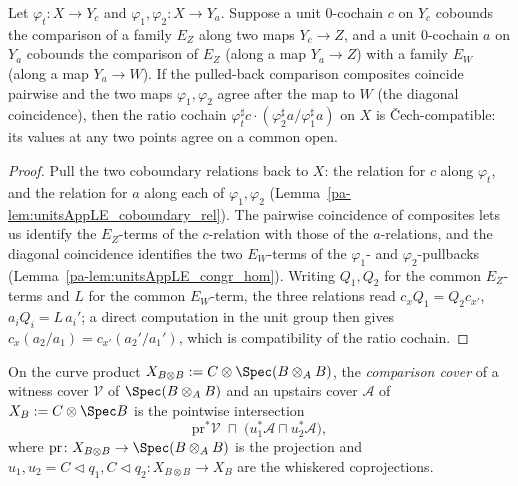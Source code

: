 \begin{lemma}
  \label{pa-lem:ratio_compat}
  \leanok

  Let \(\varphi_t \colon X \to Y_c\) and \(\varphi_1, \varphi_2 \colon X \to Y_a\). Suppose a
  unit \(0\)-cochain \(c\) on \(Y_c\) cobounds the comparison of a family \(E_Z\) along two maps
  \(Y_c \to Z\), and a unit \(0\)-cochain \(a\) on \(Y_a\) cobounds the comparison of \(E_Z\)
  (along a map \(Y_a \to Z\)) with a family \(E_W\) (along a map \(Y_a \to W\)). If the
  pulled-back comparison composites coincide pairwise and the two maps \(\varphi_1, \varphi_2\)
  agree after the map to \(W\) (the diagonal coincidence), then the ratio cochain
  \(\varphi_t^{\sharp} c \cdot (\varphi_2^{\sharp} a / \varphi_1^{\sharp} a)\) on \(X\) is
  \v Cech-compatible: its values at any two points agree on a common open.
\end{lemma}
\begin{proof}
  \leanok
  Pull the two coboundary relations back to \(X\): the relation for \(c\) along \(\varphi_t\),
  and the relation for \(a\) along each of \(\varphi_1, \varphi_2\)
  (Lemma~\ref{pa-lem:unitsAppLE_coboundary_rel}). The pairwise coincidence of composites lets us
  identify the \(E_Z\)-terms of the \(c\)-relation with those of the \(a\)-relations, and the
  diagonal coincidence identifies the two \(E_W\)-terms of the \(\varphi_1\)- and
  \(\varphi_2\)-pullbacks (Lemma~\ref{pa-lem:unitsAppLE_congr_hom}). Writing \(Q_1, Q_2\) for the
  common \(E_Z\)-terms and \(L\) for the common \(E_W\)-term, the three relations read
  \(c_x Q_1 = Q_2 c_{x'}\), \(a_i Q_i = L\,a_i'\); a direct computation in the unit group then
  gives \(c_x (a_2/a_1) = c_{x'}(a_2'/a_1')\), which is compatibility of the ratio cochain.
\end{proof}

\begin{definition}
  \label{pa-def:comparisonCover}
  \leanok

  On the curve product \(X_{B \otimes B} := C \otimes \Spec(B \otimes_A B)\), the
  \emph{comparison cover} of a witness cover \(\mathcal V\) of \(\Spec(B \otimes_A B)\) and an
  upstairs cover \(\mathcal A\) of \(X_B := C \otimes \Spec B\) is the pointwise intersection
  \[
    \mathrm{pr}^{*}\mathcal V \;\sqcap\; \bigl(u_1^{*}\mathcal A \sqcap u_2^{*}\mathcal A\bigr),
  \]
  where \(\mathrm{pr} \colon X_{B \otimes B} \to \Spec(B \otimes_A B)\) is the projection and
  \(u_1, u_2 = C \lhd q_1, C \lhd q_2 \colon X_{B \otimes B} \to X_B\) are the whiskered
  coprojections.
\end{definition}

